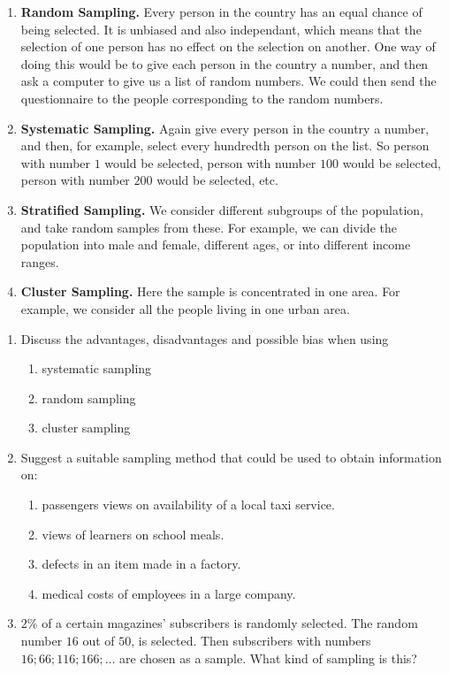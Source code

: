 \begin{enumerate}
\item[] \textbf{Random Sampling.} Every person in the country has an equal chance of being selected. It is unbiased and also independant, which means that the selection of one person has no effect on the selection on another. One way of doing this would be to give each person in the country a number, and then ask a computer to give us a list of random numbers. We could then send the questionnaire to the people corresponding to the random numbers.
\item[]  \textbf{Systematic Sampling.} Again give every person in the country a number, and then, for example, select every hundredth person on the list. So person with number $1$ would be selected, person with number $100$ would be selected, person with number $200$ would be selected, etc.
\item[] \textbf{Stratified Sampling.} We consider different subgroups of the population, and take random samples from these. For example, we can divide the population into male and female, different ages, or into different income ranges. 
\item[] \textbf{Cluster Sampling.} Here the sample is concentrated in one area. For example, we consider all the people living in one urban area.
\end{enumerate}

{
\begin{enumerate}
\item Discuss the advantages, disadvantages and possible bias when using
\begin{enumerate}
\item systematic sampling
\item random sampling
\item cluster sampling
\end{enumerate}
\item Suggest a suitable sampling method that could be used to obtain information on:
\begin{enumerate}
\item passengers views on availability of a local taxi service.
\item views of learners on school meals.
\item defects in an item made in a factory.
\item medical costs of employees in a large company.
\end{enumerate}
\item $2\%$ of a certain magazines' subscribers is randomly selected. The random number $16$ out of $50$, is selected. Then subscribers with numbers $16; 66; 116; 166; \ldots$ are chosen as a sample. What kind of sampling is this?
\end{enumerate}

}

